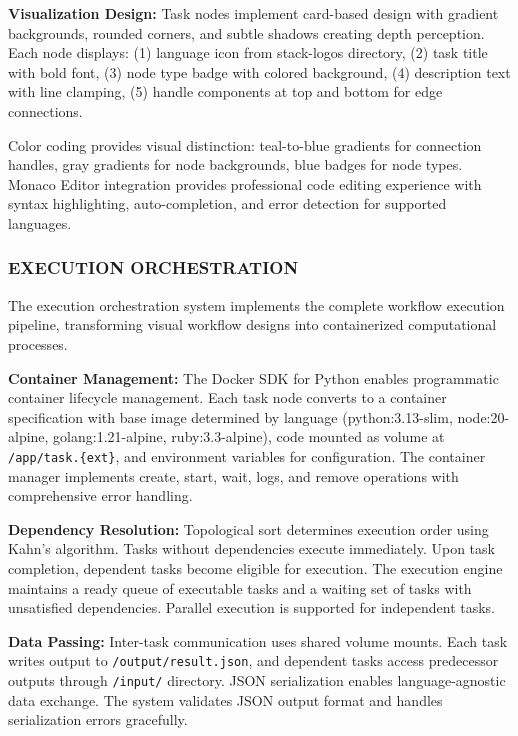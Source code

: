 \documentclass[12pt]{article}
\begin{document}
\textbf{Visualization Design:} Task nodes implement card-based design with gradient backgrounds, rounded corners, and subtle shadows creating depth perception. Each node displays: (1) language icon from stack-logos directory, (2) task title with bold font, (3) node type badge with colored background, (4) description text with line clamping, (5) handle components at top and bottom for edge connections.

Color coding provides visual distinction: teal-to-blue gradients for connection handles, gray gradients for node backgrounds, blue badges for node types. Monaco Editor integration provides professional code editing experience with syntax highlighting, auto-completion, and error detection for supported languages.

\subsubsection{EXECUTION ORCHESTRATION}

The execution orchestration system implements the complete workflow execution pipeline, transforming visual workflow designs into containerized computational processes.

\textbf{Container Management:} The Docker SDK for Python enables programmatic container lifecycle management. Each task node converts to a container specification with base image determined by language (python:3.13-slim, node:20-alpine, golang:1.21-alpine, ruby:3.3-alpine), code mounted as volume at \texttt{/app/task.\{ext\}}, and environment variables for configuration. The container manager implements create, start, wait, logs, and remove operations with comprehensive error handling.

\textbf{Dependency Resolution:} Topological sort determines execution order using Kahn's algorithm. Tasks without dependencies execute immediately. Upon task completion, dependent tasks become eligible for execution. The execution engine maintains a ready queue of executable tasks and a waiting set of tasks with unsatisfied dependencies. Parallel execution is supported for independent tasks.

\textbf{Data Passing:} Inter-task communication uses shared volume mounts. Each task writes output to \texttt{/output/result.json}, and dependent tasks access predecessor outputs through \texttt{/input/} directory. JSON serialization enables language-agnostic data exchange. The system validates JSON output format and handles serialization errors gracefully.
\end{document}
